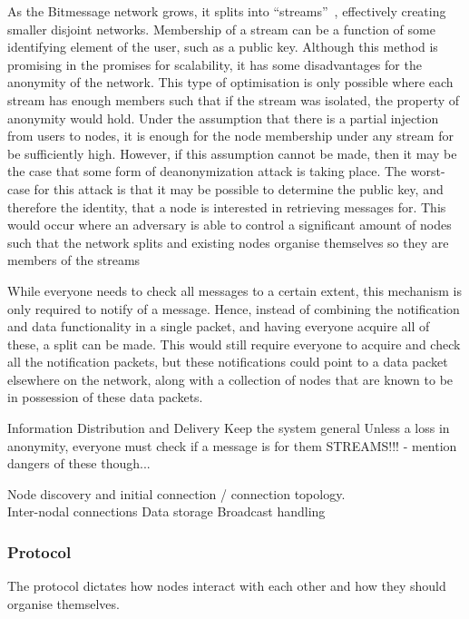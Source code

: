 			As the Bitmessage network grows, it splits into ``streams''~\cite{bitmsg}, effectively creating smaller disjoint networks. Membership of a stream can be a function of some identifying element of the user, such as a public key. Although this method is promising in the promises for scalability, it has some disadvantages for the anonymity of the network. This type of optimisation is only possible where each stream has enough members such that if the stream was isolated, the property of anonymity would hold. Under the assumption that there is a partial injection from users to nodes, it is enough for the node membership under any stream for be sufficiently high. However, if this assumption cannot be made, then it may be the case that some form of deanonymization attack is taking place. The worst-case for this attack is that it may be possible to determine the public key, and therefore the identity, that a node is interested in retrieving messages for. This would occur where an adversary is able to control a significant amount of nodes such that the network splits and existing nodes organise themselves so they are members of the streams
			
			
			
			While everyone needs to check all messages to a certain extent, this mechanism is only required to notify of a message. Hence, instead of combining the notification and data functionality in a single packet, and having everyone acquire all of these, a split can be made. This would still require everyone to acquire and check all the notification packets, but these notifications could point to a data packet elsewhere on the network, along with a collection of nodes that are known to be in possession of these data packets.
		
		Information Distribution and Delivery
			Keep the system general
			Unless a loss in anonymity, everyone must check if a message is for them
			STREAMS!!! - mention dangers of these though...
			
		Node discovery and initial connection / connection topology.\\
		
		
			
		Inter-nodal connections
		Data storage
		Broadcast handling
		\subsubsection{Protocol}
			The protocol dictates how nodes interact with each other and how they should organise themselves.
			
